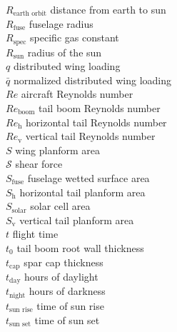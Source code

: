 \begin{multicols}{2}
\begin{tabbing}
$R_{\text{earth orbit}}$ \> distance from earth to sun \\
$R_{\text{fuse}}$ \> fuselage radius \\ %
$R_{\text{spec}}$ \> specific gas constant \\ %
$R_{\text{sun}}$ \> radius of the sun \\
$q$ \> distributed wing loading \\ %
$\bar{q}$ \> normalized distributed wing loading \\
$Re$ \> aircraft Reynolds number \\
$Re_{\text{boom}}$ \> tail boom Reynolds number \\
$Re_{\text{h}}$ \> horizontal tail Reynolds number \\
$Re_{\text{v}}$ \> vertical tail Reynolds number \\
$S$ \> wing planform area \\ %
$\mathcal{S}$ \> shear force \\ %
$S_{\text{fuse}}$ \> fuselage wetted surface area \\ %
$S_{\text{h}}$ \> horizontal tail planform area \\ %
$S_{\text{solar}}$ \> solar cell area \\ %
$S_{\text{v}}$ \> vertical tail planform area \\ %
$t$ \> flight time \\ %
$t_0$ \> tail boom root wall thickness \\ %
$t_{\text{cap}}$ \> spar cap thickness \\ %
$t_{\text{day}}$ \> hours of daylight \\ %
$t_{\text{night}}$ \> hours of darkness \\ %
$t_{\text{sun rise}}$ \> time of sun rise \\ %
$t_{\text{sun set}}$ \> time of sun set \\ %

\end{tabbing}
\end{multicols}
